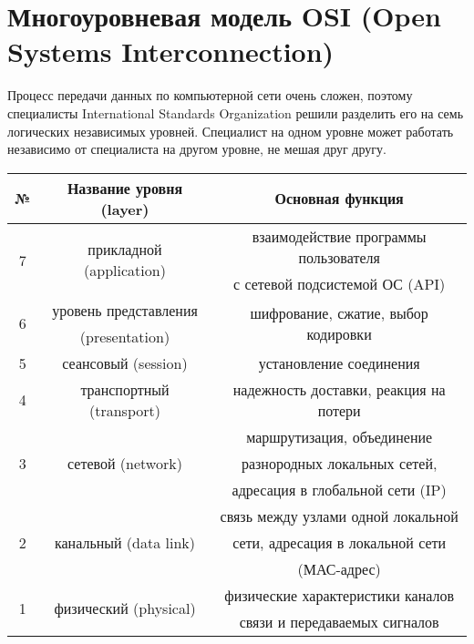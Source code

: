 \section{Многоуровневая модель OSI (Open Systems Interconnection)}
Процесс передачи данных по компьютерной сети очень сложен, поэтому специалисты International Standards Organization решили разделить его на семь логических независимых уровней. Специалист на одном уровне может работать независимо от специалиста на другом уровне, не мешая друг другу.
\begin{table}[!h]
\begin{tabular}{|c|c|c|}
\hline
№ & Название уровня (layer) & Основная функция \\
\hline
\multirow{2}{*}{7} & \multirow{2}{*}{прикладной (application)} & взаимодействие программы пользователя \\
& & с сетевой подсистемой ОС (API) \\
\hline
\multirow{2}{*}{6} & уровень представления & \multirow{2}{*}{шифрование, сжатие, выбор кодировки}\\
 & (presentation) & \\
\hline
5 & сеансовый (session)  & установление соединения\\
\hline
4 & транспортный (transport)  & надежность доставки, реакция на потери\\
\hline
\multirow{3}{*}{3} & \multirow{3}{*}{сетевой (network)} & маршрутизация, объединение  \\
& & разнородных локальных сетей, \\
& & адресация в глобальной сети (IP) \\
\hline
\multirow{3}{*}{2} & \multirow{3}{*}{канальный (data link)} & связь между узлами одной локальной \\
& & сети, адресация в локальной сети \\
& & (МАС-адрес)\\
\hline
\multirow{2}{*}{1} & \multirow{2}{*}{физический (physical)} & физические характеристики каналов  \\
& & связи и передаваемых сигналов \\
\hline
\end{tabular}
\end{table}
